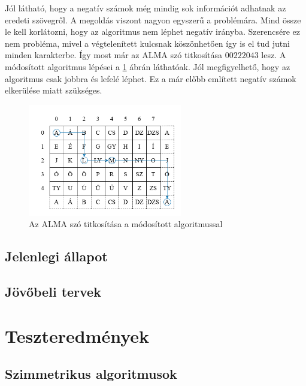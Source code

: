 \documentclass[12pt]{report} %
\begin{document}
Jól látható, hogy a negatív számok még mindig sok információt adhatnak az eredeti szövegről. A megoldás viszont nagyon egyszerű a problémára. Mind össze le kell korlátozni, hogy az algoritmus nem léphet negatív irányba. Szerencsére ez nem probléma, mivel a végtelenített kulcsnak köszönhetően így is el tud jutni minden karakterbe. Így most már az ALMA szó titkosítása $00222043$ lesz. A módosított algoritmus lépései a \ref{fig:MyAlgorithm3} ábrán láthatóak. Jól megfigyelhető, hogy az algoritmus csak jobbra és lefelé léphet. Ez a már előbb említett negatív számok elkerülése miatt szükséges.

\begin{figure}[H]
    \centering %
    \includegraphics[width=0.6\textwidth]{Figures/MyAlgorithm3.png} %
    \caption{Az ALMA szó titkosítása a módosított algoritmussal} %
    \label{fig:MyAlgorithm3} %
\end{figure}

\section{Jelenlegi állapot} %

\section{Jövőbeli tervek} %

\chapter{Teszteredmények} %

\section{Szimmetrikus algoritmusok} %
\end{document}
